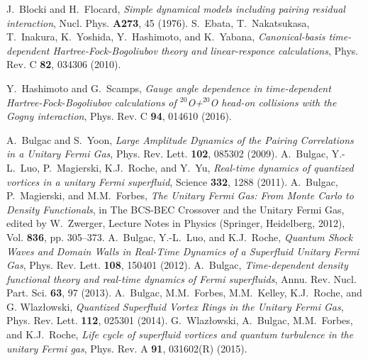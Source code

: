 \documentclass{PoS}
\begin{document}
\begin{thebibliography}{99}
J.~Blocki and H.~Flocard,
\emph{Simple dynamical models including pairing residual interaction},
Nucl. Phys. \textbf{A273}, 45 (1976).
S.~Ebata, T.~Nakatsukasa, T.~Inakura, K.~Yoshida, Y.~Hashimoto, and K.~Yabana,
\emph{Canonical-basis time-dependent Hartree-Fock-Bogoliubov theory and linear-responce calculations},
Phys. Rev. C \textbf{82}, 034306 (2010).

Y.~Hashimoto and G.~Scamps,
\emph{Gauge angle dependence in time-dependent Hartree-Fock-Bogoliubov calculations of $^\mathit{20}$O+$^\mathit{20}$O head-on collisions with the Gogny interaction},
Phys. Rev. C \textbf{94}, 014610 (2016).

A.~Bulgac and S.~Yoon,
\emph{Large Amplitude Dynamics of the Pairing Correlations in a Unitary Fermi Gas},
Phys. Rev. Lett. \textbf{102}, 085302 (2009).
A.~Bulgac, Y.-L.~Luo, P.~Magierski, K.J.~Roche, and Y.~Yu,
\emph{Real-time dynamics of quantized vortices in a unitary Fermi superfluid},
Science \textbf{332}, 1288 (2011).
A.~Bulgac, P.~Magierski, and M.M.~Forbes,
\emph{The Unitary Fermi Gas: From Monte Carlo to Density Functionals},
in The BCS-BEC Crossover and the Unitary Fermi Gas,
edited by W.~Zwerger, Lecture Notes in Physics (Springer, Heidelberg, 2012),
Vol. \textbf{836}, pp. 305--373.
A.~Bulgac, Y.-L.~Luo, and K.J.~Roche,
\emph{Quantum Shock Waves and Domain Walls in Real-Time Dynamics of a Superfluid Unitary Fermi Gas},
Phys. Rev. Lett. \textbf{108}, 150401 (2012).
A.~Bulgac,
\emph{Time-dependent density functional theory and real-time dynamics of Fermi superfluids},
Annu. Rev. Nucl. Part. Sci. \textbf{63}, 97 (2013).
A.~Bulgac, M.M.~Forbes, M.M.~Kelley, K.J.~Roche, and G. Wlaz{\l}owski,
\emph{Quantized Superfluid Vortex Rings in the Unitary Fermi Gas},
Phys. Rev. Lett. \textbf{112}, 025301 (2014).
G.~Wlaz{\l}owski, A.~Bulgac, M.M.~Forbes, and K.J.~Roche,
\emph{Life cycle of superfluid vortices and quantum turbulence in the unitary Fermi gas},
Phys. Rev. A \textbf{91}, 031602(R) (2015).


\end{thebibliography}
\end{document}
